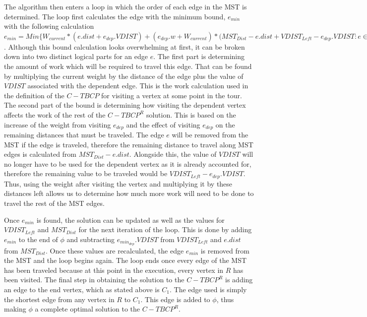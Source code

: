 \documentclass[sigconf, anonymous, pdftex]{acmart}
\begin{document}
The algorithm then enters a loop in which the order of each edge in the MST is determined. The loop first calculates the edge with the minimum bound, $e_{min}$ with the following calculation $e_{min} = Min \{ W_{current} * (e.dist + e_{dep}.VDIST) + (e_{dep}.w + W_{current}) * (MST_{Dist} - e.dist + VDIST_{Left} - e_{dep}.VDIST : e \in MST \}$. Although this bound calculation looks overwhelming at first, it can be broken down into two distinct logical parts for an edge $e$. The first part is determining the amount of work which will be required to travel this edge. That can be found by multiplying the current weight by the distance of the edge plus the value of $VDIST$ associated with the dependent edge. This is the work calculation used in the definition of the $C-TBCP$ for visiting a vertex at some point in the tour. The second part of the bound is determining how visiting the dependent vertex affects the work of the rest of the $C-TBCP^R$ solution. This is based on the increase of the weight from visiting $e_{dep}$ and the effect of visiting $e_{dep}$ on the remaining distances that must be traveled. The edge $e$ will be removed from the MST if the edge is traveled, therefore the remaining distance to travel along MST edges is calculated from $MST_{Dist} - e.dist$. Alongside this, the value of $VDIST$ will no longer have to be used for the dependent vertex as it is already accounted for, therefore the remaining value to be traveled would be $VDIST_{Left} - e_{dep}.VDIST$. Thus, using the weight after visiting the vertex and multiplying it by these distances left allows us to determine how much more work will need to be done to travel the rest of the MST edges.

Once $e_{min}$ is found, the solution can be updated as well as the values for $VDIST_{Left}$ and $MST_{Dist}$ for the next iteration of the loop. This is done by adding $e_{min}$ to the end of $\phi$ and subtracting $e_{min_{dep}}.VDIST$ from $VDIST_{Left}$ and $e.dist$ from $MST_{Dist}$. Once these values are recalculated, the edge $e_{min}$ is removed from the MST and the loop begins again. The loop ends once every edge of the MST has been traveled because at this point in the execution, every vertex in $R$ has been visited. The final step in obtaining the solution to the $C-TBCP^R$ is adding an edge to the end vertex, which as stated above is $C_1$. The edge used is simply the shortest edge from any vertex in $R$ to $C_1$. This edge is added to $\phi$, thus making $\phi$ a complete optimal solution to the $C-TBCP^R$.
\end{document}
